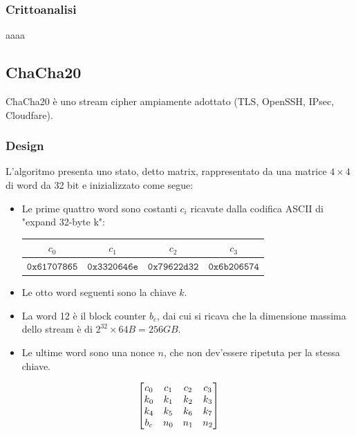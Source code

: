 \documentclass[target=bach,aauheader=,style=]{thud}
\begin{document}
			\subsubsection{Crittoanalisi}
			aaaa
		\subsection{ChaCha20\cite{chacha20}}
		ChaCha20 è uno stream cipher ampiamente adottato (TLS, OpenSSH, IPsec, Cloudfare).
			\subsubsection{Design}
			L'algoritmo presenta uno stato, detto matrix, rappresentato da una matrice $4 \times 4$ di word da 32 bit e inizializzato come segue:
			\begin{itemize}
				\item Le prime quattro word sono costanti $c_i$ ricavate dalla codifica ASCII di "expand 32-byte k":
				\begin{center}
					\begin{tabular}{|c|c|c|c|}
						\hline
						$c_0$ & $c_1$ & $c_2$ & $c_3$\\
						\hline
						$\mathtt{0x61707865}$ & $\mathtt{0x3320646e}$ & $\mathtt{0x79622d32}$ & $\mathtt{0x6b206574}$\\
						\hline
					\end{tabular}
				\end{center}
				\item Le otto word seguenti sono la chiave $k$.
				\item La word 12 è il block counter $b_c$, dai cui si ricava che la dimensione massima dello stream è di $2^{32} \times 64B = 256GB$.
				\item Le ultime word sono una nonce $n$, che non dev'essere ripetuta per la stessa chiave. 
			\end{itemize}
			\[
				\begin{bmatrix}
					c_0 & c_1 & c_2 & c_3\\
					k_0 & k_1 & k_2 & k_3\\
					k_4 & k_5 & k_6 & k_7\\
					b_c & n_0 & n_1 & n_2\\
				\end{bmatrix}\\
			\]
			
\end{document}
